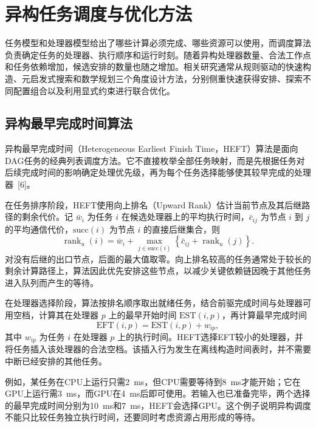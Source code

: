 \section{异构任务调度与优化方法}

任务模型和处理器模型给出了哪些计算必须完成、哪些资源可以使用，而调度算法负责确定任务的处理器、执行顺序和运行时刻。随着异构处理器数量、合法工作点和任务依赖增加，候选安排的数量也随之增加。相关研究通常从规则驱动的快速构造、元启发式搜索和数学规划三个角度设计方法，分别侧重快速获得安排、探索不同配置组合以及利用显式约束进行联合优化。

\subsection{异构最早完成时间算法}

异构最早完成时间（Heterogeneous Earliest Finish Time，HEFT）算法是面向DAG任务的经典列表调度方法。它不直接枚举全部任务映射，而是先根据任务对后续完成时间的影响确定处理优先级，再为每个任务选择能够使其较早完成的处理器~[6]。

在任务排序阶段，HEFT使用向上排名（Upward Rank）估计当前节点及其后继路径的剩余代价。记 $\bar w_i$ 为任务 $i$ 在候选处理器上的平均执行时间，$\bar c_{ij}$ 为节点 $i$ 到 $j$ 的平均通信代价，$\mathrm{succ}(i)$ 为节点 $i$ 的直接后继集合，则
\begin{equation}\label{eq:ch2-heft-rank}
 \operatorname{rank}_u(i)=\bar w_i+
 \max_{j\in\mathrm{succ}(i)}
 \left\{\bar c_{ij}+\operatorname{rank}_u(j)\right\}.
\end{equation}
对没有后继的出口节点，后面的最大值取零。向上排名较高的任务通常处于较长的剩余计算路径上，算法因此优先安排这些节点，以减少关键依赖链因晚于其他任务进入队列而产生的等待。

在处理器选择阶段，算法按排名顺序取出就绪任务，结合前驱完成时间与处理器可用空档，计算其在处理器 $p$ 上的最早开始时间 $\mathrm{EST}(i,p)$，再计算最早完成时间
\begin{equation}\label{eq:ch2-heft-eft}
 \mathrm{EFT}(i,p)=\mathrm{EST}(i,p)+w_{ip},
\end{equation}
其中 $w_{ip}$ 为任务 $i$ 在处理器 $p$ 上的执行时间。HEFT选择EFT较小的处理器，并将任务插入该处理器的合法空档。该插入行为发生在离线构造时间表时，并不需要中断已经安排的其他任务。

例如，某任务在CPU上运行只需2~ms，但CPU需要等待到8~ms才能开始；它在GPU上运行需3~ms，而GPU在4~ms后即可使用。若输入也已准备完毕，两个选择的最早完成时间分别为10~ms和7~ms，HEFT会选择GPU。这个例子说明异构调度不能只比较任务独立执行时间，还要同时考虑资源占用形成的等待。

